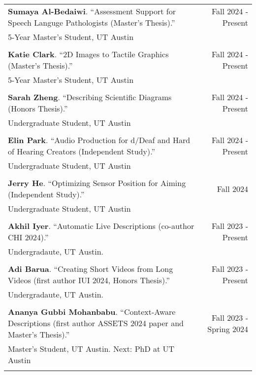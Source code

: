 \begin{longtable}{Xr}
	\textbf{Sumaya Al-Bedaiwi}. ``Assessment Support for Speech Languge Pathologists (Master's Thesis).'' & Fall 2024 - Present \\
	5-Year Master's Student, UT Austin &  \\
	\\

	\textbf{Katie Clark}. ``2D Images to Tactile Graphics (Master's Thesis).'' & Fall 2024 - Present \\
	5-Year Master's Student, UT Austin &  \\
	\\

	\textbf{Sarah Zheng}. ``Describing Scientific Diagrams (Honors Thesis).'' & Fall 2024 - Present \\
	Undergraduate Student, UT Austin &  \\
	\\

	\textbf{Elin Park}. ``Audio Production for d/Deaf and Hard of Hearing Creators (Independent Study).'' & Fall 2024 - Present \\
	Undergraduate Student, UT Austin &  \\
	\\

	\textbf{Jerry He}. ``Optimizing Sensor Position for Aiming (Independent Study).'' & Fall 2024 \\
	Undergraduate Student, UT Austin &  \\
	\\

	\textbf{Akhil Iyer}. ``Automatic Live Descriptions (co-author CHI 2024).'' & Fall 2023 - Present \\
	Undergradaute, UT Austin. &  \\
	\\

	\textbf{Adi Barua}. ``Creating Short Videos from Long Videos (first author IUI 2024, Honors Thesis).'' & Fall 2023 - Present \\
	Undergradaute, UT Austin. &  \\
	\\

	\textbf{Ananya Gubbi Mohanbabu}. ``Context-Aware Descriptions (first author ASSETS 2024 paper and Master's Thesis).'' & Fall 2023 - Spring 2024 \\
	Master's Student, UT Austin. Next: PhD at UT Austin &  \\
	\\


\end{longtable}
